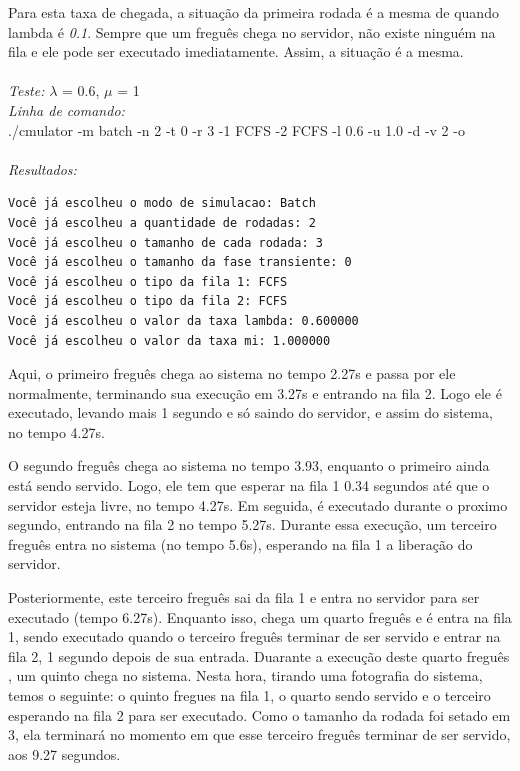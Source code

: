 \documentclass[a4paper,10pt]{article}
\begin{document}
    Para esta taxa de chegada, a situação da primeira rodada é a mesma de quando lambda é \emph{0.1}. Sempre que um freguês chega no servidor, não existe ninguém na fila e ele pode ser executado imediatamente. Assim, a situação é a mesma.
\\
\\
\emph{Teste:} $\lambda$ = 0.6, $\mu$ = 1
\\
\emph{Linha de comando:}
\\
./cmulator -m batch -n 2 -t 0 -r 3 -1 FCFS -2 FCFS -l 0.6 -u 1.0 -d -v 2 -o
\\
\\
\emph{Resultados:}
\\\begin{verbatim}
Você já escolheu o modo de simulacao: Batch
Você já escolheu a quantidade de rodadas: 2
Você já escolheu o tamanho de cada rodada: 3
Você já escolheu o tamanho da fase transiente: 0
Você já escolheu o tipo da fila 1: FCFS
Você já escolheu o tipo da fila 2: FCFS
Você já escolheu o valor da taxa lambda: 0.600000
Você já escolheu o valor da taxa mi: 1.000000
\end{verbatim}

    Aqui, o primeiro freguês chega ao sistema no tempo 2.27s e passa por ele normalmente, terminando sua execução em 3.27s e entrando na fila 2. Logo ele é executado, levando mais 1 segundo e só saindo do servidor, e assim do sistema, no tempo 4.27s.

    O segundo freguês chega ao sistema no tempo 3.93, enquanto o primeiro ainda está sendo servido. Logo, ele tem que esperar na fila 1 0.34 segundos até que o servidor esteja livre, no tempo 4.27s. Em seguida, é executado durante o proximo segundo, entrando na fila 2 no tempo 5.27s. Durante essa execução, um terceiro freguês entra no sistema (no tempo 5.6s), esperando na fila 1 a liberação do servidor.

    Posteriormente, este terceiro freguês sai da fila 1 e entra no servidor para ser executado (tempo 6.27s). Enquanto isso, chega um quarto freguês e é entra na fila 1, sendo executado quando o terceiro freguês terminar de ser servido e entrar na fila 2, 1 segundo depois de sua entrada. Duarante a execução deste quarto freguês , um quinto chega no sistema. Nesta hora, tirando uma fotografia do sistema, temos o seguinte: o quinto fregues na fila 1, o quarto sendo servido e o terceiro esperando na fila 2 para ser executado. Como o tamanho da rodada foi setado em 3, ela terminará no momento em que esse terceiro freguês terminar de ser servido, aos 9.27 segundos.
\end{document}
